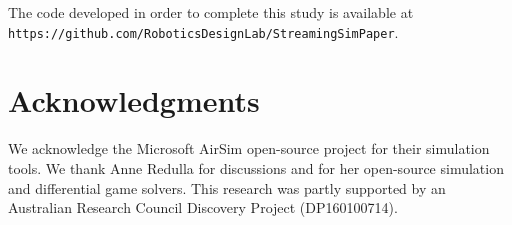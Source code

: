\documentclass{article}
\begin{document}
The code developed in order to complete this study is available at {\texttt{\small{https://github.com/RoboticsDesignLab/StreamingSimPaper}}}.



%
%


\afterpage{\clearpage}

\section*{Acknowledgments}
We acknowledge the Microsoft AirSim open-source project for their simulation tools. %
We thank Anne Redulla for discussions and for her open-source simulation and differential game solvers.  This research was partly supported by an Australian Research Council Discovery Project (DP160100714).


%
%


\end{document}
